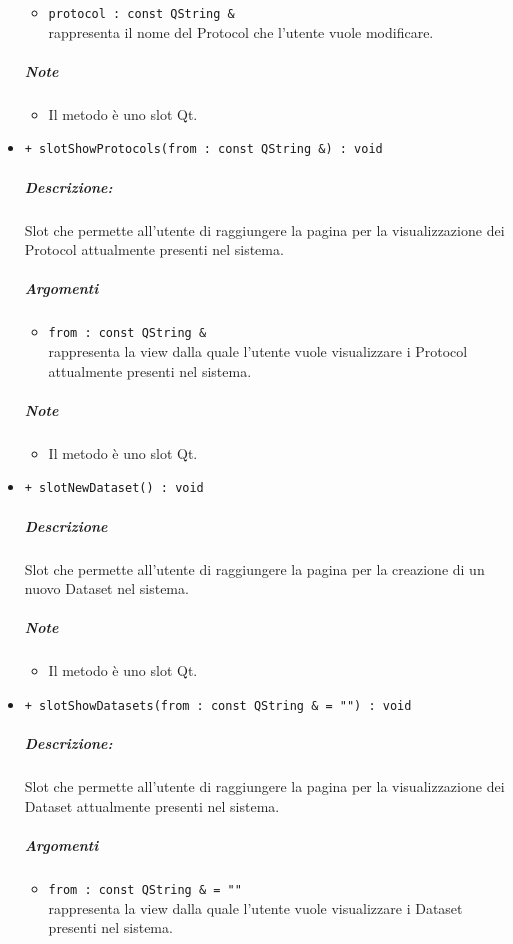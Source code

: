 \begin{itemize}
			\begin{itemize}
				\item \color{RoyalPurple} \verb!protocol : const QString &!\\				
\color{black} rappresenta il nome del Protocol\g{} che l'utente vuole modificare.
			\end{itemize}
			\subparagraph{Note}
			\begin{itemize}
				\item Il metodo è uno slot\g{} Qt\g{}.
			\end{itemize}
			\item \color{blue} \verb!+ slotShowProtocols(from : const QString &) : void!
			\color{black}
			\subparagraph{Descrizione:} Slot\g{} che permette all'utente di raggiungere la pagina per la visualizzazione dei Protocol\g{} attualmente presenti nel sistema.
			\color{black}
			\subparagraph{Argomenti}
			\begin{itemize}
				\item \color{RoyalPurple} \verb!from : const QString &!\\				
\color{black} rappresenta la view dalla quale l'utente vuole visualizzare i Protocol\g{} attualmente presenti nel sistema.
			\end{itemize}
			\subparagraph{Note}
			\begin{itemize}
				\item Il metodo è uno slot\g{} Qt\g{}.
			\end{itemize}
			\item \color{blue} \verb!+ slotNewDataset() : void!
			\color{black}
			\subparagraph{Descrizione} Slot\g{} che permette all'utente di raggiungere la pagina per la creazione di un nuovo Dataset\g{} nel sistema.
			\subparagraph{Note}
			\begin{itemize}
				\item Il metodo è uno slot\g{} Qt\g{}.
			\end{itemize}
			\item \color{blue} \verb!+ slotShowDatasets(from : const QString & = "") : void!
			\color{black}
			\subparagraph{Descrizione:} Slot\g{} che permette all'utente di raggiungere la pagina per la visualizzazione dei Dataset\g{} attualmente presenti nel sistema.
			\color{black}
			\subparagraph{Argomenti}
			\begin{itemize}
				\item \color{RoyalPurple} \verb!from : const QString & = ""!\\				
\color{black} rappresenta la view dalla quale l'utente vuole visualizzare i Dataset\g{} presenti nel sistema.

\end{itemize}
\end{itemize}
